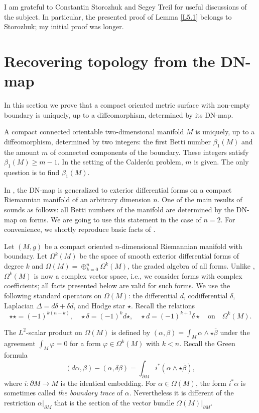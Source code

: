 \documentclass[12pt,reqno]{amsart}
\begin{document}
I am grateful to Constantin Storozhuk and Segey Treil for useful discussions of the subject. In particular, the presented proof of Lemma \ref{L5.1} belongs to Storozhuk; my initial proof was longer.

\section{Recovering topology from the DN-map}

In this section we prove that a compact oriented metric surface with non-empty boundary is uniquely, up to a diffeomorphism, determined by its DN-map.

A compact connected orientable two-dimensional manifold $M$ is uniquely, up to a diffeomorphism, determined by two integers: the first Betti number $\beta_1(M)$ and the amount $m$ of connected components of the boundary. These integers satisfy
$\beta_1(M)\ge m-1$.
In the setting of the Calder\'{o}n problem, $m$ is given. The only question is to find $\beta_1(M)$.

In \cite{BS}, the DN-map is generalized to exterior differential forms on a compact Riemannian manifold of an arbitrary dimension $n$. One of the main results of \cite{BS} sounds as follows: all Betti numbers of the manifold are determined by the DN-map on forms. We are going to use this statement in the case of $n=2$. For convenience, we shortly reproduce basic facts of \cite{BS}.

Let $(M,g)$ be a compact oriented $n$-dimensional Riemannian manifold with boundary.
Let
$ \Omega^k(M) $ be the space of smooth exterior differential forms of degree $ k $ and $ \Omega(M)=\oplus_{k=0}^n\Omega^k(M) $,
the graded algebra of all forms. Unlike \cite{BS}, $ \Omega^k(M) $ is now a complex vector space, i.e., we consider forms with complex coefficients; all facts presented below are valid for such forms.
We use the following standard operators on $ \Omega(M) $:
the differential $ d $, codifferential $ \delta $,
Laplacian $ \Delta=d\delta+\delta d $, and Hodge star $ \star $.
Recall the relations
$$
\star\star=(-1)^{k(n-k)},\quad
\star\delta=(-1)^kd\star,\quad
\star d=(-1)^{k+1}\delta\star
\quad \mbox{on}\quad \Omega^k(M).
$$

The $ L^2 $-scalar product on $ \Omega(M) $ is defined by
$ (\alpha,\beta)=\int_{M}\alpha\wedge\star\overline\beta $
under the agreement $ \int_{M}\varphi=0 $ for a form
$ \varphi\in \Omega^k(M) $ with $ k<n $.
Recall the Green formula
$$
(d\alpha,\beta)-(\alpha,\delta\beta)=
\int_{\partial M}i^*(\alpha\wedge\star\overline\beta),
$$
where $ i:\partial M\rightarrow M $ is the identical embedding.
For $ \alpha\in\Omega(M) $, the form $ i^*\alpha $ is sometimes called {\it the boundary trace} of $ \alpha $. Nevertheless it is different of the restriction $\alpha|_{\partial M}$ that is the section of the vector bundle $\Omega(M)|_{\partial M}$.
\end{document}
